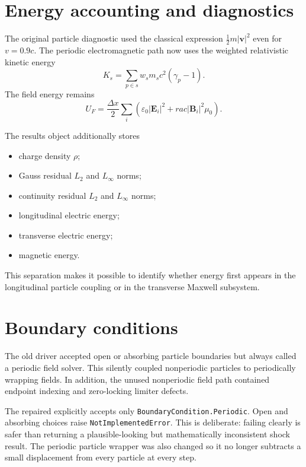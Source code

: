 \documentclass[11pt,a4paper]{article}
\newcommand{\epsz}{\varepsilon_0}
\newcommand{\mucz}{\mu_0}
\newcommand{\code}[1]{\texttt{#1}}
\begin{document}
\section{Energy accounting and diagnostics}

The original particle diagnostic used the classical expression
$\tfrac12m|\mathbf{v}|^2$ even for $v=0.9c$.  The periodic electromagnetic path
now uses the weighted relativistic kinetic energy
\begin{equation}
  K_s=\sum_{p\in s}w_sm_sc^2(\gamma_p-1).
\end{equation}
The field energy remains
\begin{equation}
  U_F=\frac{\Delta x}{2}\sum_i
  \left(\epsz|\mathbf{E}_i|^2+rac{|\mathbf{B}_i|^2}{\mucz}\right).
\end{equation}

The results object additionally stores
\begin{itemize}
  \item charge density $\rho$;
  \item Gauss residual $L_2$ and $L_\infty$ norms;
  \item continuity residual $L_2$ and $L_\infty$ norms;
  \item longitudinal electric energy;
  \item transverse electric energy;
  \item magnetic energy.
\end{itemize}
This separation makes it possible to identify whether energy first appears in
the longitudinal particle coupling or in the transverse Maxwell subsystem.

\section{Boundary conditions}

The old driver accepted open or absorbing particle boundaries but always
called a periodic field solver.  This silently coupled nonperiodic particles to
periodically wrapping fields.  In addition, the unused nonperiodic field path
contained endpoint indexing and zero-locking limiter defects.

The repaired  explicitly accepts only
\code{BoundaryCondition.Periodic}.  Open and absorbing choices raise
\code{NotImplementedError}.  This is deliberate: failing clearly is safer than
returning a plausible-looking but mathematically inconsistent shock result.
The periodic particle wrapper was also changed so it no longer subtracts a
small displacement from every particle at every step.
\end{document}
